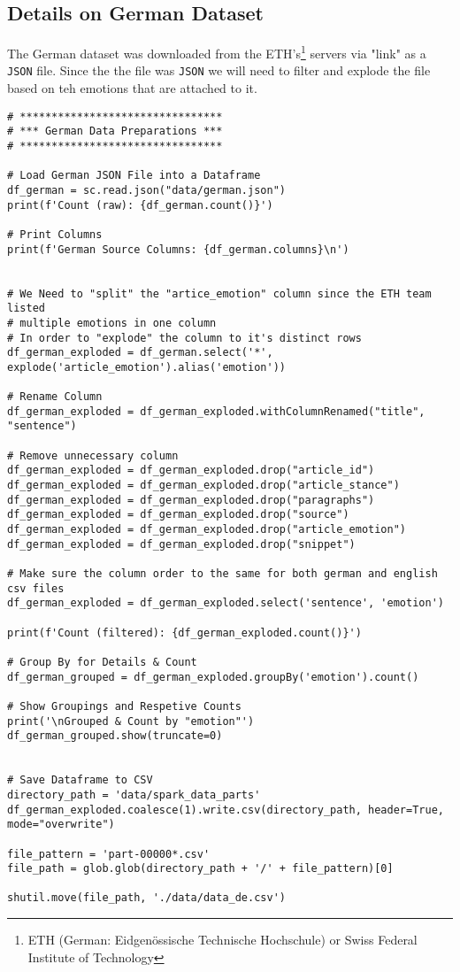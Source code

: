 \subsection{Details on German Dataset}
\label{appendix:dataset_german}
The German dataset was downloaded from the ETH's\footnote{ETH (German: Eidgenössische Technische Hochschule) or Swiss Federal Institute of Technology} servers via "link" as a \texttt{JSON} file. Since the the file was \texttt{JSON} we will need to filter and explode the file based on teh emotions that are attached to it.
\begin{verbatim}
# ********************************
# *** German Data Preparations ***
# ********************************

# Load German JSON File into a Dataframe
df_german = sc.read.json("data/german.json")
print(f'Count (raw): {df_german.count()}')

# Print Columns
print(f'German Source Columns: {df_german.columns}\n')


# We Need to "split" the "artice_emotion" column since the ETH team listed
# multiple emotions in one column
# In order to "explode" the column to it's distinct rows
df_german_exploded = df_german.select('*', explode('article_emotion').alias('emotion'))

# Rename Column
df_german_exploded = df_german_exploded.withColumnRenamed("title", "sentence")

# Remove unnecessary column
df_german_exploded = df_german_exploded.drop("article_id")
df_german_exploded = df_german_exploded.drop("article_stance")
df_german_exploded = df_german_exploded.drop("paragraphs")
df_german_exploded = df_german_exploded.drop("source")
df_german_exploded = df_german_exploded.drop("article_emotion")
df_german_exploded = df_german_exploded.drop("snippet")

# Make sure the column order to the same for both german and english csv files
df_german_exploded = df_german_exploded.select('sentence', 'emotion')

print(f'Count (filtered): {df_german_exploded.count()}')

# Group By for Details & Count
df_german_grouped = df_german_exploded.groupBy('emotion').count()

# Show Groupings and Respetive Counts
print('\nGrouped & Count by "emotion"')
df_german_grouped.show(truncate=0)


# Save Dataframe to CSV
directory_path = 'data/spark_data_parts'
df_german_exploded.coalesce(1).write.csv(directory_path, header=True, mode="overwrite")

file_pattern = 'part-00000*.csv'
file_path = glob.glob(directory_path + '/' + file_pattern)[0]

shutil.move(file_path, './data/data_de.csv')
\end{verbatim}


\clearpage
